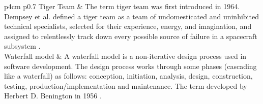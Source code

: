 \begin{longtable}{ p{4cm} p{0.7\linewidth}}
Tiger Team & The term tiger team was first introduced in 1964. Dempsey et al. defined a tiger team as a team of undomesticated and uninhibited technical specialists, selected for their experience, energy, and imagination, and assigned to relentlessly track down every possible source of failure in a spacecraft subsystem \cite{dempsey1964program}. \\

Waterfall model & A waterfall model is a non-iterative design process used in software development. The design process works through some phases (cascading like a waterfall) as follows: conception, initiation, analysis, design, construction, testing, production/implementation and maintenance. The term developed by Herbert D. Benington in 1956 \cite{benington1983production}.\\

\end{longtable}
\newpage
